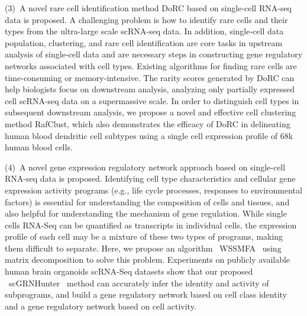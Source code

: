 \begin{abstracten}
(3)~A novel rare cell identification method DoRC based on single-cell RNA-seq data is proposed.
A challenging problem is how to identify rare cells and their types from the ultra-large scale scRNA-seq data. 
In addition, single-cell data population, clustering, and rare cell identification are core tasks in upstream analysis of single-cell data and are necessary steps in constructing gene regulatory networks associated with cell types. 
Existing algorithms for finding rare cells are time-consuming or memory-intensive.
The rarity scores generated by DoRC can help biologists focus on downstream analysis, 
analyzing only partially expressed cell scRNA-seq data on a supermassive scale. 
In order to distinguish cell types in subsequent downstream analysis, we propose a novel and effective cell clustering method RafClust, 
which also demonstrates the efficacy of DoRC in delineating human blood dendritic cell subtypes using a single cell expression profile of 68k human blood cells. 

(4)~A novel gene expression regulatory network approach based on single-cell RNA-seq data is proposed. 
Identifying cell type characteristics and cellular gene expression activity programs (e.g., life cycle processes, responses to environmental factors) is essential for understanding the composition of cells and tissues,
and also helpful for understanding the mechanism of gene regulation. 
While single cells RNA-Seq can be quantified as transcripts in individual cells, 
the expression profile of each cell may be a mixture of these two types of programs, 
making them difficult to separate. 
Here, we propose an algorithm ~WSSMFA~ using matrix decomposition to solve this problem. 
Experiments on publicly available human brain organoids scRNA-Seq datasets show that our proposed ~scGRNHunter~ method can accurately infer the identity and activity of subprograms, 
and build a gene regulatory network based on cell class identity and a gene regulatory network based on cell activity.

\end{abstracten}